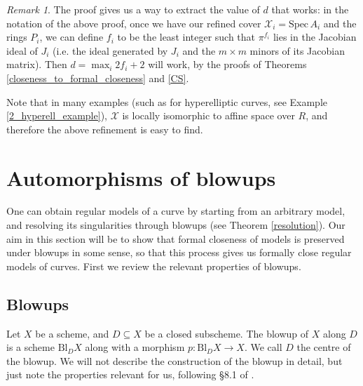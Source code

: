 \documentclass{article}
\theoremstyle{definition}
\theoremstyle{plain}
\theoremstyle{remark}
\newtheorem{remark}[defn]{Remark}
\newcommand{\spec}{\mathrm{Spec}\,}
\newcommand{\bl}{\mathrm{Bl}}
\begin{document}
	\begin{remark}\label{remark_closeness}
	The proof gives us a way to extract the value of $d$ that works: in the notation of the above proof, once we have our refined cover $\mathcal{X}_i = \spec A_i$ and the rings $P_i$, we can define $f_i$ to be the least integer such that $\pi^{f_i}$ lies in the Jacobian ideal of $J_i$ (i.e. the ideal generated by $J_i$ and the $m\times m$ minors of its Jacobian matrix). Then $d = \max_i 2f_i+2$ will work, by the proofs of Theorems \ref{closeness_to_formal_closeness} and \ref{CS}.
	
	Note that in many examples (such as for hyperelliptic curves, see Example \ref{2_hyperell_example}), $\mathcal{X}$ is locally isomorphic to affine space over $R$, and therefore the above refinement is easy to find.
	\end{remark}
	\section{Automorphisms of blowups}\label{section_blowups}
	One can obtain regular models of a curve by starting from an arbitrary model, and resolving its singularities through blowups (see Theorem \ref{resolution}). Our aim in this section will be to show that formal closeness of models is preserved under blowups in some sense, so that this process gives us formally close regular models of curves. First we review the relevant properties of blowups.
	\subsection{Blowups}
	Let $X$ be a scheme, and $D\subseteq X$ be a closed subscheme. The blowup of $X$ along $D$ is a scheme $\bl_D X$ along with a morphism $p: \bl_D X\to X$. We call $D$ the centre of the blowup. We will not describe the construction of the blowup in detail, but just note the properties relevant for us, following §8.1 of \cite{liu2002algebraic}.
	
\end{document}
